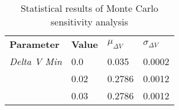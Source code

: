 
                    \begin{table}[]
                    \centering
                    \begin{tabular}{l l l l}
                    \rowcolor[HTML]{EFEFEF} \textbf{Parameter} & \textbf{Value} & \textbf{$\mu_{\Delta V}$} & \textbf{$\sigma_{\Delta V}$} \\
                    \textit{Delta V Min} & 0.0 & 0.035 & 0.0002 \\
 & 0.02 & 0.2786 & 0.0012 \\
 & 0.03 & 0.2786 & 0.0012 \\

                    \end{tabular}
                    \caption{Statistical results of Monte Carlo sensitivity analysis}
                    \label{tab:SensitivityAnalysis}
                    \end{table}
                    